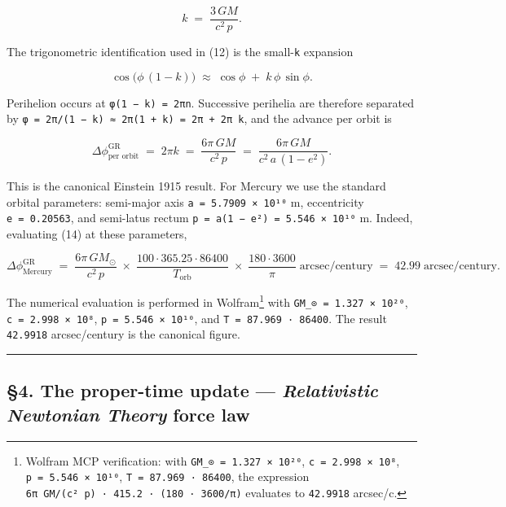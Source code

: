\documentclass[
  11pt,
]{article}
\begin{document}
\[
k \;=\; \frac{3\,GM}{c^{2}\,p}. \tag{13}
\]

The trigonometric identification used in (12) is the small-\texttt{k}
expansion

\[
\cos\bigl(\phi\,(1 - k)\bigr) \;\approx\; \cos\phi \;+\; k\,\phi\,\sin\phi. \tag{13a}
\]

Perihelion occurs at \texttt{φ(1\ −\ k)\ =\ 2πn}. Successive perihelia
are therefore separated by
\texttt{φ\ =\ 2π/(1\ −\ k)\ ≈\ 2π(1\ +\ k)\ =\ 2π\ +\ 2π\ k}, and the
advance per orbit is

\[
\Delta\phi^{\text{GR}}_{\text{per orbit}}
\;=\; 2\pi k
\;=\; \frac{6\pi\,GM}{c^{2}\,p}
\;=\; \frac{6\pi\,GM}{c^{2}\,a\,(1-e^{2})}. \tag{14}
\]

This is the canonical Einstein 1915 result. For Mercury we use the
standard orbital parameters: semi-major axis
\texttt{a\ =\ 5.7909\ ×\ 10¹⁰} m, eccentricity \texttt{e\ =\ 0.20563},
and semi-latus rectum \texttt{p\ =\ a(1\ −\ e²)\ =\ 5.546\ ×\ 10¹⁰} m.
Indeed, evaluating (14) at these parameters,

\[
\Delta\phi^{\text{GR}}_{\text{Mercury}}
\;=\; \frac{6\pi\,GM_{\odot}}{c^{2}\,p}
\;\times\; \frac{100 \cdot 365.25 \cdot 86400}{T_{\text{orb}}}
\;\times\; \frac{180 \cdot 3600}{\pi}
\;\text{arcsec/century}
\;=\; 42.99\;\text{arcsec/century}. \tag{15}
\]

The numerical evaluation is performed in Wolfram\footnote{Wolfram MCP
  verification: with \texttt{GM\_⊙\ =\ 1.327\ ×\ 10²⁰},
  \texttt{c\ =\ 2.998\ ×\ 10⁸}, \texttt{p\ =\ 5.546\ ×\ 10¹⁰},
  \texttt{T\ =\ 87.969\ ·\ 86400}, the expression
  \texttt{6π\ GM/(c²\ p)\ ·\ 415.2\ ·\ (180\ ·\ 3600/π)} evaluates to
  \texttt{42.9918} arcsec/c.} with \texttt{GM\_⊙\ =\ 1.327\ ×\ 10²⁰},
\texttt{c\ =\ 2.998\ ×\ 10⁸}, \texttt{p\ =\ 5.546\ ×\ 10¹⁰}, and
\texttt{T\ =\ 87.969\ ·\ 86400}. The result \texttt{42.9918}
arcsec/century is the canonical figure.

\begin{center}\rule{0.5\linewidth}{0.5pt}\end{center}

\hypertarget{the-proper-time-update-relativistic-newtonian-theory-force-law}{%
\subsection{\texorpdfstring{§4. The proper-time update ---
\emph{Relativistic Newtonian Theory} force
law}{§4. The proper-time update --- Relativistic Newtonian Theory force law}}\label{the-proper-time-update-relativistic-newtonian-theory-force-law}}
\end{document}
